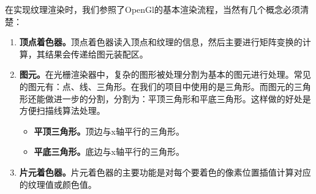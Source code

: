         	在实现纹理渲染时，我们参照了OpenGl的基本渲染流程，当然有几个概念必须清楚：
       \begin{enumerate}
       	\item \textbf{\textcolor{hbrs}{顶点着色器。}}顶点着色器读入顶点和纹理的信息，然后主要进行矩阵变换的计算，其结果会传递给图元装配区。
       	\item \textbf{\textcolor{hbrs}{图元。}}在光栅渲染器中，复杂的图形被处理分割为基本的图元进行处理。常见的图元有：点、线、三角形。在我们的项目中使用的是三角形。而图元的三角形还能做进一步的分割，分割为：平顶三角形和平底三角形。这样做的好处是方便扫描线算法处理。
       	\begin{itemize}
       		\item \textbf{\textcolor{hbrs}{平顶三角形。}}顶边与x轴平行的三角形。
       	\item \textbf{\textcolor{hbrs}{平底三角形。}}底边与x轴平行的三角形。
       	\end{itemize}

       	\item \textbf{\textcolor{hbrs}{片元着色器。}}片元着色器的主要功能是对每个要着色的像素位置插值计算对应的纹理值或颜色值。
       	
       \end{enumerate}
